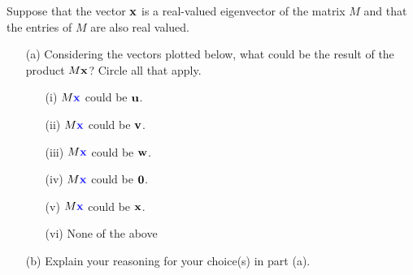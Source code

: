 \begin{problem}
    Suppose that the vector {\color{blue} ${\bf x}$} is a real-valued eigenvector of the matrix $M$ and that
    the entries of $M$ are also real valued.
    \begin{enumerate}
        \item[(a)] Considering the vectors plotted below, what could be the result of the
            product $M{\bf x}$?  Circle all that apply.
            \begin{center}
            \end{center}
            \begin{itemize}
                \item[(i)] $M{\color{blue} {\bf x}}$ could be {\color{red} ${\bf u}$}.
                \item[(ii)] $M{\color{blue} {\bf x}}$ could be {\color{green!50!black} ${\bf v}$}.
                \item[(iii)] $M{\color{blue} {\bf x}}$ could be {\color{cyan} ${\bf w}$}.
                \item[(iv)] $M{\color{blue} {\bf x}}$ could be {\color{black} ${\bf 0}$}.
                \item[(v)] $M{\color{blue} {\bf x}}$ could be {\color{blue} ${\bf x}$}.
                \item[(vi)] None of the above
            \end{itemize}
        \item[(b)] Explain your reasoning for your choice(s) in part (a).
    \end{enumerate}
\end{problem}
